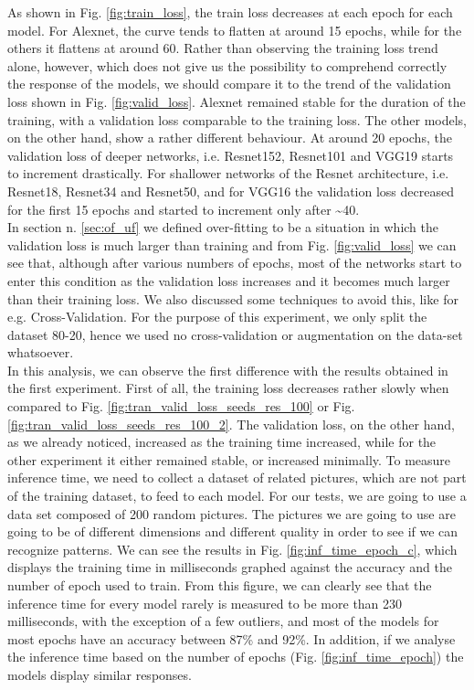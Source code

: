As shown in Fig. \ref{fig:train_loss}, the train loss decreases at each epoch for each model. For Alexnet, the curve tends to flatten at around 15 epochs, while for the others it flattens at around 60. Rather than observing the training loss trend alone, however, which does not give us the possibility to comprehend correctly the response of the models, we should compare it to the trend of the validation loss shown in Fig. \ref{fig:valid_loss}. Alexnet remained stable for the duration of the training, with a validation loss comparable to the training loss. The other models, on the other hand, show a rather different behaviour. At around 20 epochs, the validation loss of deeper networks, i.e. Resnet152, Resnet101 and VGG19 starts to increment drastically. For shallower networks of the Resnet architecture, i.e. Resnet18, Resnet34 and Resnet50, and for VGG16 the validation loss decreased for the first 15 epochs and started to increment only after \textasciitilde40.\\
In section n. \ref{sec:of_uf} we defined over-fitting to be a situation in which the validation loss is much larger than training and from Fig. \ref{fig:valid_loss} we can see that, although after various numbers of epochs, most of the networks start to enter this condition as the validation loss increases and it becomes much larger than their training loss. We also discussed some techniques to avoid this, like for e.g. Cross-Validation. For the purpose of this experiment, we only split the dataset 80-20, hence we used no cross-validation or augmentation on the data-set whatsoever. \\
In this analysis, we can observe the first difference with the results obtained in the first experiment. First of all, the training loss decreases rather slowly when compared to Fig. \ref{fig:tran_valid_loss_seeds_res_100} or Fig.  \ref{fig:tran_valid_loss_seeds_res_100_2}. The validation loss, on the other hand, as we already noticed, increased as the training time increased, while for the other experiment it either remained stable, or increased minimally.
To measure inference time, we need to collect a dataset of related pictures, which are not part of the training dataset, to feed to each model. For our tests, we are going to use a data set composed of 200 random pictures. The pictures we are going to use are going to be of different dimensions and different quality in order to see if we can recognize patterns. We can see the results in Fig. \ref{fig:inf_time_epoch_c}, which displays the training time in milliseconds graphed against the accuracy and the number of epoch used to train. From this figure, we can clearly see that the inference time for every model rarely is measured to be more than 230 milliseconds, with the exception of a few outliers, and most of the models for most epochs have an accuracy between 87\% and 92\%. In addition, if we analyse the inference time based on the number of epochs (Fig. \ref{fig:inf_time_epoch}) the models display similar responses.  \\

